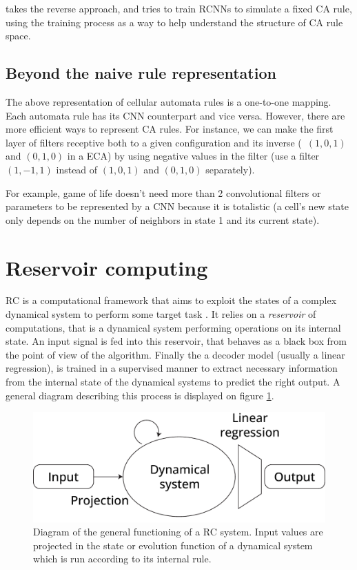 \textcite{gilpinCellularAutomataConvolutional2018} takes the reverse approach, and
tries to train RCNNs to simulate a fixed CA rule, using the training process as
a way to help understand the structure of CA rule space.

\subsection{Beyond the naive rule representation}

The above representation of cellular automata rules is a one-to-one mapping.
Each automata rule has its CNN counterpart and vice versa. However, there are
more efficient ways to represent CA rules. For instance, we can make the first
layer of filters receptive both to a given configuration and its inverse
(\eg~$(1, 0, 1)$ and $(0, 1, 0)$ in a ECA) by using negative values in the
filter (use a filter $(1, -1, 1)$ instead of $(1, 0, 1)$ and $(0, 1, 0)$
separately).

For example, game of life doesn't need more than 2 convolutional filters or
parameters to be represented by a CNN because it is totalistic (a cell's new
state only depends on the number of neighbors in state 1 and its current state).


\section{Reservoir computing \label{sec:res-models}}
\Ac{RC} is a computational framework that aims to exploit the states of a
complex dynamical system to perform some target task
\parencite{tanakaRecentAdvancesPhysical2019}. It relies on a \emph{reservoir} of
computations, that is a dynamical system performing operations on its internal
state. An input signal is fed into this reservoir, that behaves as a black box
from the point of view of the algorithm. Finally the a decoder model (usually a
linear regression), is trained in a supervised manner to extract necessary
information from the internal state of the dynamical systems to predict the
right output. A general diagram describing this process is displayed on figure
\ref{fig:reservoir_diagram}.

\begin{figure}[htbp]
  \centering
  \includegraphics[width=.8\linewidth]{figures/reservoir_schema}
  \caption{Diagram of the general functioning of a \ac{RC} system. Input values
    are projected in the state or evolution function of a dynamical system which
    is run according to its internal rule. }
  \label{fig:reservoir_diagram}
\end{figure}

